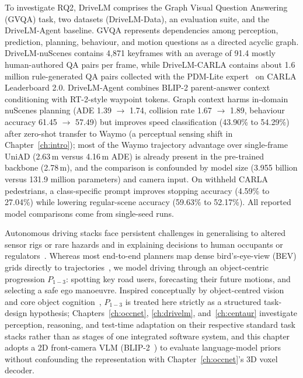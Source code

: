 To investigate RQ2, DriveLM comprises the Graph Visual Question Answering (GVQA) task, two datasets (DriveLM-Data), an evaluation suite, and the DriveLM-Agent baseline. GVQA represents dependencies among perception, prediction, planning, behaviour, and motion questions as a directed acyclic graph. DriveLM-nuScenes contains 4,871 keyframes with an average of 91.4 mostly human-authored QA pairs per frame, while DriveLM-CARLA contains about 1.6 million rule-generated QA pairs collected with the PDM-Lite expert~\cite{beisswenger2024pdmlite} on CARLA Leaderboard 2.0. DriveLM-Agent combines BLIP-2 parent-answer context conditioning with RT-2-style waypoint tokens. Graph context harms in-domain nuScenes planning (ADE 1.39 $\rightarrow$ 1.74, collision rate 1.67 $\rightarrow$ 1.89, behaviour accuracy 61.45 $\rightarrow$ 57.49) but improves speed classification (43.90\% to 54.29\%) after zero-shot transfer to Waymo (a perceptual sensing shift in Chapter~\ref{ch:intro}); most of the Waymo trajectory advantage over single-frame UniAD (2.63\,m versus 4.16\,m ADE) is already present in the pre-trained backbone (2.78\,m), and the comparison is confounded by model size (3.955 billion versus 131.9 million parameters) and camera input. On withheld CARLA pedestrians, a class-specific prompt improves stopping accuracy (4.59\% to 27.04\%) while lowering regular-scene accuracy (59.63\% to 52.17\%). All reported model comparisons come from single-seed runs.

Autonomous driving stacks face persistent challenges in generalising to altered sensor rigs or rare hazards and in explaining decisions to human occupants or regulators~\cite{chen2024e2esurvey,chib2023recent,atakishiyev2023explaining}. Whereas most end-to-end planners map dense bird's-eye-view (BEV) grids directly to trajectories~\cite{hu2023uniad,chitta2023transfuser,li2023bevdevils}, we model driving through an object-centric progression $P_{1-3}$: spotting key road users, forecasting their future motions, and selecting a safe ego manoeuvre. Inspired conceptually by object-centred vision~\cite{Marr82} and core object cognition~\cite{spelke2007core}, $P_{1-3}$ is treated here strictly as a structured task-design hypothesis; Chapters~\ref{ch:occnet}, \ref{ch:drivelm}, and~\ref{ch:centaur} investigate perception, reasoning, and test-time adaptation on their respective standard task stacks rather than as stages of one integrated software system, and this chapter adopts a 2D front-camera VLM (BLIP-2~\cite{li2023blip2}) to evaluate language-model priors without confounding the representation with Chapter~\ref{ch:occnet}'s 3D voxel decoder.


